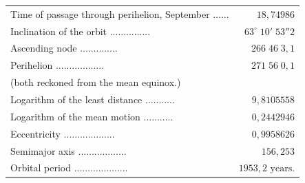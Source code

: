 \begin{center}\fontsize{9}{11}\selectfont\setlength{\tabcolsep}{3pt}\renewcommand{\arraystretch}{1.15}\begin{tabular}{lr}
Time of passage through perihelion, September .\;.\;.\;.\;.\;.\; & $18{,}74986$\\
Inclination of the orbit .\;.\;.\;.\;.\;.\;.\;.\;.\;.\;.\;.\;.\;.\;.\; & $63^\circ\;10'\;53''2$\\
Ascending node .\;.\;.\;.\;.\;.\;.\;.\;.\;.\;.\;.\;.\;.\; & $266\;46\;3{,}1$\\
Perihelion .\;.\;.\;.\;.\;.\;.\;.\;.\;.\;.\;.\;.\;.\;.\;.\;.\;.\; & $271\;56\;0{,}1$\\
\multicolumn{2}{l}{(both reckoned from the mean equinox.)}\\
Logarithm of the least distance .\;.\;.\;.\;.\;.\;.\;.\;.\;.\;.\; & $9{,}8105558$\\
Logarithm of the mean motion .\;.\;.\;.\;.\;.\;.\;.\;.\;.\;.\; & $0{,}2442946$\\
Eccentricity .\;.\;.\;.\;.\;.\;.\;.\;.\;.\;.\;.\;.\;.\;.\;.\;.\;.\;.\; & $0{,}9958626$\\
Semimajor axis .\;.\;.\;.\;.\;.\;.\;.\;.\;.\;.\;.\;.\;.\;.\;.\;.\;.\; & $156{,}253$\\
Orbital period .\;.\;.\;.\;.\;.\;.\;.\;.\;.\;.\;.\;.\;.\;.\;.\;.\;.\;.\;.\; & $1953{,}2\text{ years.}$\\
\end{tabular}\end{center}
